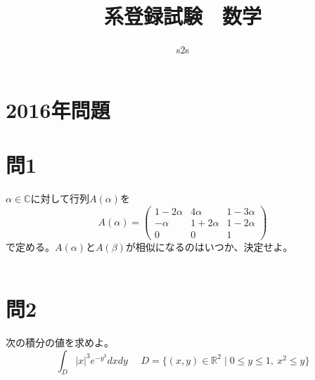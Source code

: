 ﻿\documentclass{jsarticle}
\begin{document}
\title{系登録試験　数学}
\author{s2s}
\date{}
\maketitle

\section*{2016年問題}
\section*{問1}
\noindent
$\alpha \in \mathbb{C}$に対して行列$A(\alpha)$を
$$
A(\alpha) = \begin{pmatrix} 1-2\alpha &4\alpha &1-3\alpha \\ -\alpha &1 + 2\alpha & 1-2\alpha \\ 0 & 0 &1 \end{pmatrix}
$$
で定める。$A(\alpha)$と$A(\beta)$が相似になるのはいつか、決定せよ。\\ \\

\section*{問2}
\noindent
次の積分の値を求めよ。
$$
\int_{D} |x|^3 e^{- y^3}dxdy \ \ \ \ \ \ D =\{(x, y) \in \mathbb{R}^2 \mid 0 \leq y \leq 1, \ x^2 \leq y \}
$$ \\ \\
\end{document}
